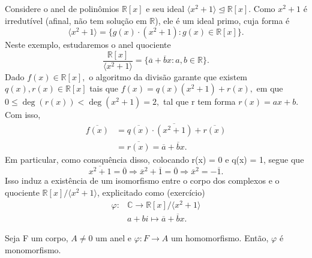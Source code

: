 \documentclass[AlgebraII/algebraII_notes.tex]{subfiles}
\begin{document}
\begin{example}
	Considere o anel de polinômios \(\mathbb{R}[x]\) e seu ideal \(\langle x^{2}+1 \rangle\trianglelefteq \mathbb{R}[x]\).
	Como \(x^{2}+1\) é irredutível (afinal, não tem solução em \(\mathbb{R}\)), ele é um ideal primo, cuja forma é
	\[
		\langle x^{2}+1 \rangle = \{g(x)\cdot (x^{2}+1):g(x)\in \mathbb{R}[x]\}.
	\]
	Neste exemplo, estudaremos o anel quociente
	\[
		\frac{\mathbb{R}[x]}{\langle x^{2}+1 \rangle} = \{\overline{a} + \overline{b}x: a, b\in \mathbb{R}\}.
	\]
	Dado \(f(x)\in \mathbb{R}[x],\) o algoritmo da divisão garante que existem \(q(x), r(x)\in \mathbb{R}[x]\) tais que
	\(f(x) = q(x)(x^{2}+1) + r(x),\) em que \(0 \leq \deg{(r(x))} < \deg{(x^{2}+1)} = 2,\) tal que r tem forma \(r(x) = ax + b\).
	Com isso,
	\begin{align*}
		\overline{f(x)} & = \overline{q(x)}\cdot \overline{(x^{2}+1)} + \overline{r(x)} \\
		                & = \overline{r(x)} = \overline{a}+\overline{b}x.
	\end{align*}
	Em particular, como consquência disso, colocando r(x) = 0 e q(x) = 1, segue que
	\[
		\overline{x^{2}+1} = \overline{0} \Rightarrow \overline{x}^{2} + \overline{1} = \overline{0} \Rightarrow \overline{x}^{2} = -\overline{1}.
	\]
	Isso induz a existência de um isomorfismo entre o corpo dos complexos e o quociente \(\mathbb{R}[x]/\langle x^{2}+1 \rangle\), explicitado como (exercício)
	\begin{align*}
		\varphi : & \mathbb{C}\rightarrow \mathbb{R}[x]/\langle x^{2}+1 \rangle \\
		          & a + bi\mapsto \overline{a} + \overline{b}x.
	\end{align*}
\end{example}
\begin{prop*}[Exercício]
	Seja F um corpo, \(A\neq 0\) um anel e \(\varphi : F\rightarrow A\) um homomorfismo. Então, \(\varphi \) é monomorfismo.
\end{prop*}
\end{document}
